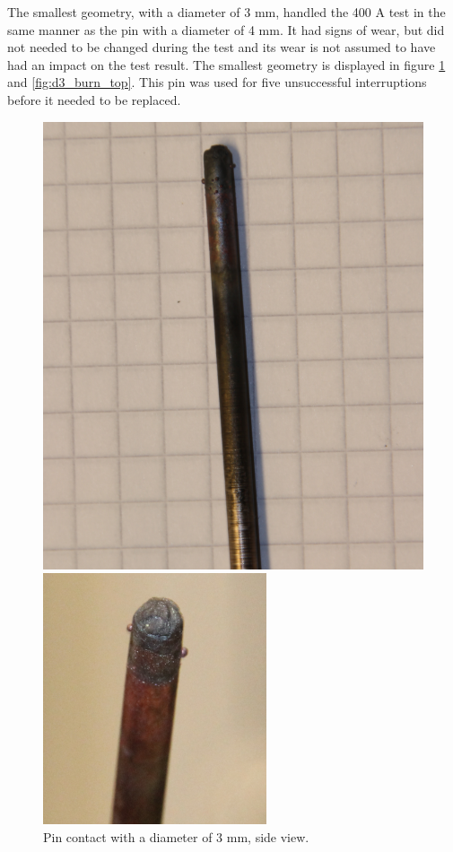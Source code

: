 \documentclass[10pt,a4paper,twoside]{article}
\begin{document}
The smallest geometry, with a diameter of 3 mm, handled the 400 A test in the same manner as the pin with a diameter of 4 mm. It had signs of wear, but did not needed to be changed during the test and its wear is not assumed to have had an impact on the test result. The smallest geometry is displayed in figure \ref{fig:d3_burn_side} and \ref{fig:d3_burn_top}. This pin was used for five unsuccessful interruptions before it needed to be replaced.


\begin{figure}[H]
\centering
\begin{minipage}{.5\textwidth}
  \centering
  \includegraphics[scale=0.2]{Bilder/Discussion/d3_630_burn.png}
  \caption{Pin contact with a diameter of 3 mm, \newline side view.}
  \label{fig:d3_burn_side}
\end{minipage}%
\begin{minipage}{.5\textwidth}
  \centering
  \includegraphics[scale=0.61]{Bilder/Discussion/d3_630_top_burn.png}

\end{minipage}
\end{figure}
\end{document}
